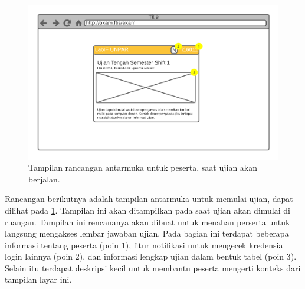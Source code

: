     \begin{figure}[H]
        \centering
        \includegraphics[width=0.7\paperwidth]{Gambar/mockups/Mockup--Peserta - Prestartstate.pdf}
        \caption{Tampilan rancangan antarmuka untuk peserta, saat ujian akan berjalan.}
        \label{fig:mockup_peserta_prestartstate}
    \end{figure}
    Rancangan berikutnya adalah tampilan antarmuka untuk memulai ujian, dapat dilihat pada 
    \ref{fig:mockup_peserta_prestartstate}. Tampilan ini akan ditampilkan
    pada saat ujian akan dimulai di ruangan. Tampilan ini rencananya akan dibuat untuk menahan
    perserta untuk langsung mengakses lembar jawaban ujian. Pada bagian ini terdapat beberapa informasi
    tentang peserta (poin 1), fitur notifikasi untuk mengecek kredensial login lainnya (poin 2),
    dan informasi lengkap ujian dalam bentuk tabel (poin 3).
    Selain itu terdapat deskripsi kecil untuk membantu peserta mengerti konteks dari tampilan
    layar ini. 
    
